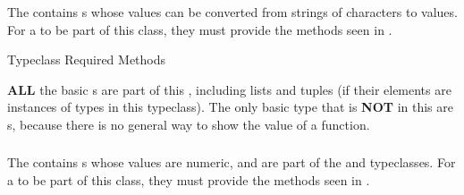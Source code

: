 \subsubsection{\texorpdfstring{}{\texttt{Read}}}\label{subsubsec:Read_Typeclass}
The   contains s whose values can be converted from strings of characters to values.
For a  to be part of this class, they must provide the methods seen in .

\begin{listing}[h!tbp]
\caption{ Typeclass Required Methods}
\label{lst:Read_Typeclass_Methods}
\end{listing}

\textbf{ALL} the basic s are part of this , including lists and tuples (if their elements are instances of types in this typeclass).
The only basic type that is \textbf{NOT} in this  are s, because there is no general way to show the value of a function.

\subsubsection{\texorpdfstring{}{\texttt{Num}}}\label{subsubsec:Num_Typeclass}
The   contains s whose values are numeric, and are part of the  and  typeclasses.
For a  to be part of this class, they must provide the methods seen in .

\subsubsection{\texorpdfstring{}{\texttt{Integral}}}\label{subsubsec:Integral_Typeclass}
\subsubsection{\texorpdfstring{}{\texttt{Fractional}}}\label{subsubsec:Fractional_Typeclass}
